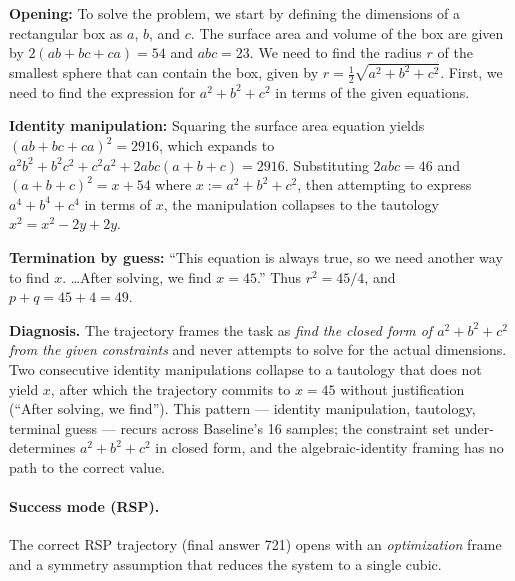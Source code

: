 \begin{tcolorbox}[colback=gray!5, colframe=black!60, arc=3pt, boxrule=0.5pt, fontupper=\footnotesize, breakable, title={Baseline trajectory (final answer 49) --- excerpts}]
\textbf{Opening:} To solve the problem, we start by defining the dimensions of a rectangular box as $a$, $b$, and $c$. The surface area and volume of the box are given by $2(ab + bc + ca) = 54$ and $abc = 23$. We need to find the radius $r$ of the smallest sphere that can contain the box, given by $r = \tfrac{1}{2}\sqrt{a^2 + b^2 + c^2}$. First, we need to find the expression for $a^2 + b^2 + c^2$ in terms of the given equations.

\textbf{Identity manipulation:} Squaring the surface area equation yields $(ab + bc + ca)^2 = 2916$, which expands to $a^2b^2 + b^2c^2 + c^2a^2 + 2abc(a + b + c) = 2916$. Substituting $2abc = 46$ and $(a+b+c)^2 = x + 54$ where $x := a^2 + b^2 + c^2$, then attempting to express $a^4 + b^4 + c^4$ in terms of $x$, the manipulation collapses to the tautology $x^2 = x^2 - 2y + 2y$.

\textbf{Termination by guess:} ``This equation is always true, so we need another way to find $x$. \dots After solving, we find $x = 45$.'' Thus $r^2 = 45/4$, and $p + q = 45 + 4 = \boxed{49}$.
\end{tcolorbox}

\textbf{Diagnosis.} The trajectory frames the task as \emph{find the closed form of $a^2+b^2+c^2$ from the given constraints} and never attempts to solve for the actual dimensions. Two consecutive identity manipulations collapse to a tautology that does not yield $x$, after which the trajectory commits to $x = 45$ without justification (``After solving, we find''). This pattern --- identity manipulation, tautology, terminal guess --- recurs across Baseline's 16 samples; the constraint set under-determines $a^2 + b^2 + c^2$ in closed form, and the algebraic-identity framing has no path to the correct value.

\paragraph{Success mode (RSP).} The correct RSP trajectory (final answer 721) opens with an \emph{optimization} frame and a symmetry assumption that reduces the system to a single cubic.


